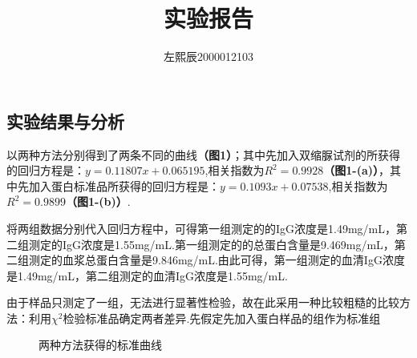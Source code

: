 \documentclass[UTF8]{ctexart}
\title{实验报告}
\author{左熙辰2000012103}
\begin{document}
	\maketitle
	\subsection{实验结果与分析}
	以两种方法分别得到了两条不同的曲线\textbf{（图1）}；其中先加入双缩脲试剂的所获得的回归方程是：$y = 0.11807x + 0.065195$,相关指数为$R^{2} = 0.9928$\textbf{（图1-(a)）}，其中先加入蛋白标准品所获得的回归方程是：$y = 0.1093x + 0.07538$,相关指数为$R^{2} = 0.9899$\textbf{（图1-(b)）}.
	
	将两组数据分别代入回归方程中，可得第一组测定的的IgG浓度是1.49mg/mL，第二组测定的IgG浓度是1.55mg/mL.第一组测定的的总蛋白含量是9.469mg/mL，第二组测定的血浆总蛋白含量是9.846mg/mL.由此可得，第一组测定的血清IgG浓度是1.49mg/mL，第二组测定的血清IgG浓度是1.55mg/mL.
	
	由于样品只测定了一组，无法进行显著性检验，故在此采用一种比较粗糙的比较方法：利用$\chi ^{2}$检验标准品确定两者差异.先假定先加入蛋白样品的组作为标准组
	
	
\begin{figure}[htb]
	\centering
	\caption{两种方法获得的标准曲线}
\end{figure}
\end{document}
